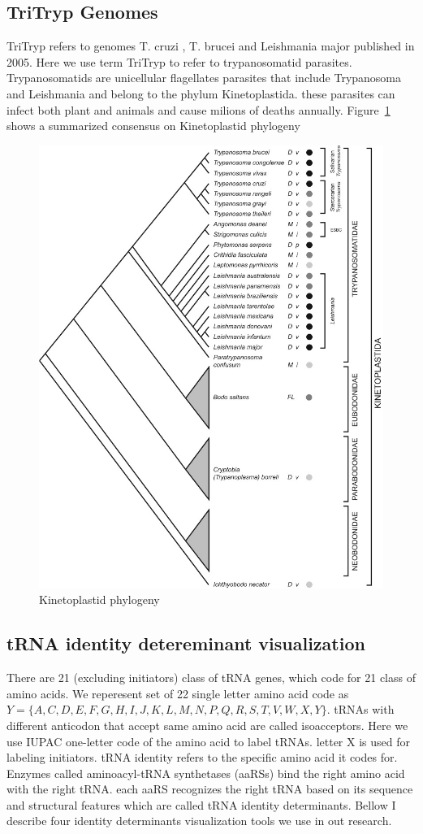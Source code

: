 \documentclass[
10pt, %
a4paper, %
oneside, %
headinclude,footinclude, %
BCOR5mm, %
]{scrartcl}
\begin{document}
\subsection{\textbf{TriTryp Genomes}}
TriTryp refers to genomes T. cruzi \cite{El-Sayed409} , T. brucei \cite{Berriman416} and Leishmania major \cite{Ivens436} published in 2005. Here we use term TriTryp to refer to trypanosomatid parasites. Trypanosomatids are unicellular flagellates parasites that include Trypanosoma and Leishmania and belong to the phylum Kinetoplastida. these parasites can infect both plant and animals and cause milions of deaths annually. Figure~\ref{fig:Kinetoplastid} shows a summarized consensus on Kinetoplastid phylogeny\cite{jackson_2015}

\begin{figure}[H]
\centering 
\includegraphics[width=0.7\columnwidth]{Kinetoplastida.jpg} 
\caption[Kinetoplastid phylogeny]{Kinetoplastid phylogeny}
\label{fig:Kinetoplastid} 
\end{figure}

\subsection{\textbf{tRNA identity detereminant visualization}}
There are 21 (excluding initiators) class of tRNA genes, which code for 21 class of amino acids. We reperesent set of 22 single letter amino acid code as $Y = \{A, C, D, E, F, G, H, I, J, K, L, M, N, P, Q, R, S, T, V, W, X, Y \}$. tRNAs with different anticodon that accept same amino acid are called isoacceptors. Here we use IUPAC one-letter code of the amino acid to label tRNAs. letter X is used for labeling initiators. tRNA identity refers to the specific amino acid it codes for. Enzymes called aminoacyl-tRNA synthetases (aaRSs) bind the right amino acid with the right tRNA. each aaRS recognizes the right tRNA based on its sequence and structural features which are called tRNA identity determinants. Bellow I describe four identity determinants visualization tools we use in out research. 
\end{document}
